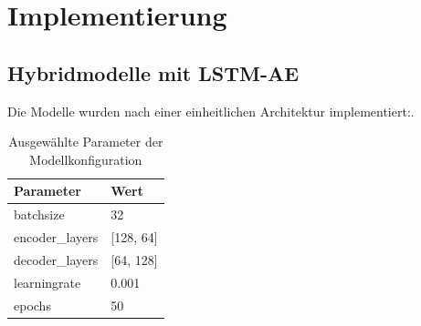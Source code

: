 \documentclass[a4paper,12pt]{article}
\begin{document}
	\section{Implementierung}
	\subsection{Hybridmodelle mit LSTM-AE}
	Die Modelle wurden nach einer einheitlichen Architektur implementiert:. 
	
	\begin{table}[H]
		\centering
		\begin{tabular}{ll}
			\toprule
			\textbf{Parameter} & \textbf{Wert} \\
			\midrule
			\gls{batchsize} & 32 \\
			encoder\_layers & [128, 64] \\
			decoder\_layers & [64, 128] \\
			\gls{learningrate} & 0.001 \\
			epochs & 50 \\
			\bottomrule
		\end{tabular}
		\caption{Ausgewählte Parameter der Modellkonfiguration}
		\label{tab:model_params}
	\end{table}
	
\end{document}
